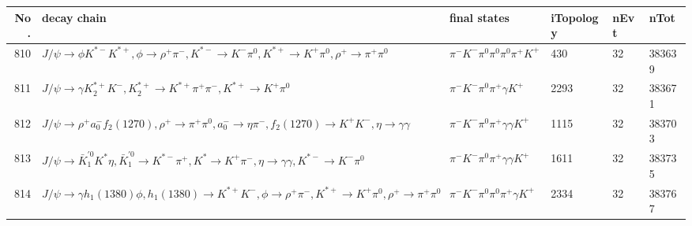 \begin{table}[htbp] 
\begin{center}
\begin{small}
\begin{tabular}{rlllll}\hline\hline
 No. & decay chain & final states &  iTopology & nEvt & nTot \\\hline
810&$J/\psi       \rightarrow \phi           K^{*-}         K^{*+}         , \phi            \rightarrow \rho^{+}      \pi^{-}        , K^{*-}          \rightarrow K^{-}          \pi^{0}        , K^{*+}          \rightarrow K^{+}          \pi^{0}        , \rho^{+}       \rightarrow \pi^{+}        \pi^{0}        $&$\pi^{-}        K^{-}          \pi^{0}        \pi^{0}        \pi^{0}        \pi^{+}        K^{+}          $&  430&   32&383639\\
811&$J/\psi       \rightarrow \gamma       K_2^{*+}       K^{-}          , K_2^{*+}        \rightarrow K^{*+}         \pi^{+}        \pi^{-}        , K^{*+}          \rightarrow K^{+}          \pi^{0}        $&$\pi^{-}        K^{-}          \pi^{0}        \pi^{+}        \gamma       K^{+}          $& 2293&   32&383671\\
812&$J/\psi       \rightarrow \rho^{+}      a_{0}^{-}      f_{2}(1270)    , \rho^{+}       \rightarrow \pi^{+}        \pi^{0}        , a_{0}^{-}       \rightarrow \eta          \pi^{-}        , f_{2}(1270)     \rightarrow K^{+}          K^{-}          , \eta           \rightarrow \gamma       \gamma       $&$\pi^{-}        K^{-}          \pi^{0}        \pi^{+}        \gamma       \gamma       K^{+}          $& 1115&   32&383703\\
813&$J/\psi       \rightarrow \bar{K}_1^{'0}K^{*}          \eta          , \bar{K}_1^{'0} \rightarrow K^{*-}         \pi^{+}        , K^{*}           \rightarrow K^{+}          \pi^{-}        , \eta           \rightarrow \gamma       \gamma       , K^{*-}          \rightarrow K^{-}          \pi^{0}        $&$\pi^{-}        K^{-}          \pi^{0}        \pi^{+}        \gamma       \gamma       K^{+}          $& 1611&   32&383735\\
814&$J/\psi       \rightarrow \gamma       h_{1}(1380)    \phi           , h_{1}(1380)     \rightarrow K^{*+}         K^{-}          , \phi            \rightarrow \rho^{+}      \pi^{-}        , K^{*+}          \rightarrow K^{+}          \pi^{0}        , \rho^{+}       \rightarrow \pi^{+}        \pi^{0}        $&$\pi^{-}        K^{-}          \pi^{0}        \pi^{0}        \pi^{+}        \gamma       K^{+}          $& 2334&   32&383767\\

\end{tabular}
\end{small}
\end{center}
\end{table}
